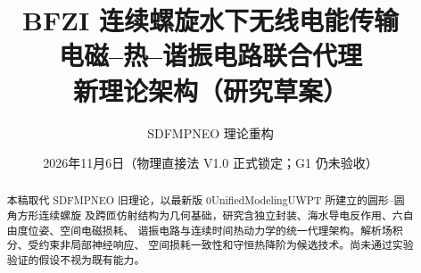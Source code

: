\documentclass[UTF8,11pt,a4paper]{ctexart}
\title{BFZI 连续螺旋水下无线电能传输\\电磁--热--谐振电路联合代理\\\large 新理论架构（研究草案）}
\author{SDFMPNEO 理论重构}
\date{2026年11月6日（物理直接法 V1.0 正式锁定；G1 仍未验收）}
\begin{document}
\maketitle
\begin{abstract}
本稿取代 SDFMPNEO 旧理论，以最新版 0UnifiedModelingUWPT 所建立的圆形--圆角方形连续螺旋
及跨匝仿射结构为几何基础，研究含独立封装、海水导电反作用、六自由度位姿、空间电磁损耗、
谐振电路与连续时间热动力学的统一代理架构。解析场积分、受约束非局部神经响应、
空间损耗一致性和守恒热降阶为候选技术。尚未通过实验验证的假设不视为既有能力。
\end{abstract}
\tableofcontents



























\end{document}
